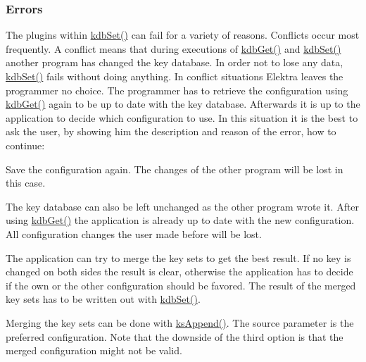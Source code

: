 \subsubsection*{Errors}

The plugins within {\ttfamily \hyperlink{group__kdb_ga11436b058408f83d303ca5e996832bcf}{kdb\+Set()}} can fail for a variety of reasons. Conflicts occur most frequently. A conflict means that during executions of {\ttfamily \hyperlink{group__kdb_ga28e385fd9cb7ccfe0b2f1ed2f62453a1}{kdb\+Get()}} and {\ttfamily \hyperlink{group__kdb_ga11436b058408f83d303ca5e996832bcf}{kdb\+Set()}} another program has changed the key database. In order not to lose any data, {\ttfamily \hyperlink{group__kdb_ga11436b058408f83d303ca5e996832bcf}{kdb\+Set()}} fails without doing anything. In conflict situations Elektra leaves the programmer no choice. The programmer has to retrieve the configuration using {\ttfamily \hyperlink{group__kdb_ga28e385fd9cb7ccfe0b2f1ed2f62453a1}{kdb\+Get()}} again to be up to date with the key database. Afterwards it is up to the application to decide which configuration to use. In this situation it is the best to ask the user, by showing him the description and reason of the error, how to continue\+:


\begin{DoxyEnumerate}
\item Save the configuration again. The changes of the other program will be lost in this case.
\item The key database can also be left unchanged as the other program wrote it. After using {\ttfamily \hyperlink{group__kdb_ga28e385fd9cb7ccfe0b2f1ed2f62453a1}{kdb\+Get()}} the application is already up to date with the new configuration. All configuration changes the user made before will be lost.
\item The application can try to merge the key sets to get the best result. If no key is changed on both sides the result is clear, otherwise the application has to decide if the own or the other configuration should be favored. The result of the merged key sets has to be written out with {\ttfamily \hyperlink{group__kdb_ga11436b058408f83d303ca5e996832bcf}{kdb\+Set()}}.
\item Merging the key sets can be done with {\ttfamily \hyperlink{group__keyset_ga21eb9c3a14a604ee3a8bdc779232e7b7}{ks\+Append()}}. The source parameter is the preferred configuration. Note that the downside of the third option is that the merged configuration might not be valid.
\end{DoxyEnumerate}

